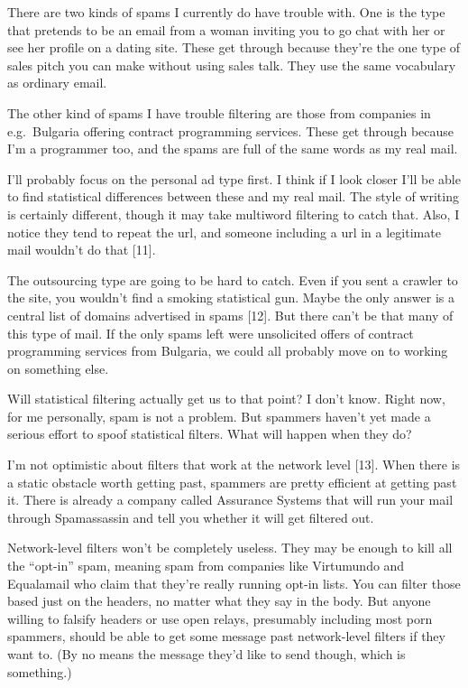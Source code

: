 There are two kinds of spams I currently do have trouble with. One is
the type that pretends to be an email from a woman inviting you to go
chat with her or see her profile on a dating site. These get through
because they're the one type of sales pitch you can make without using
sales talk. They use the same vocabulary as ordinary email.

The other kind of spams I have trouble filtering are those from
companies in e.g.~Bulgaria offering contract programming services. These
get through because I'm a programmer too, and the spams are full of the
same words as my real mail.

I'll probably focus on the personal ad type first. I think if I look
closer I'll be able to find statistical differences between these and my
real mail. The style of writing is certainly different, though it may
take multiword filtering to catch that. Also, I notice they tend to
repeat the url, and someone including a url in a legitimate mail
wouldn't do that {[}11{]}.

The outsourcing type are going to be hard to catch. Even if you sent a
crawler to the site, you wouldn't find a smoking statistical gun. Maybe
the only answer is a central list of domains advertised in spams
{[}12{]}. But there can't be that many of this type of mail. If the only
spams left were unsolicited offers of contract programming services from
Bulgaria, we could all probably move on to working on something else.

Will statistical filtering actually get us to that point? I don't know.
Right now, for me personally, spam is not a problem. But spammers
haven't yet made a serious effort to spoof statistical filters. What
will happen when they do?

I'm not optimistic about filters that work at the network level
{[}13{]}. When there is a static obstacle worth getting past, spammers
are pretty efficient at getting past it. There is already a company
called Assurance Systems that will run your mail through Spamassassin
and tell you whether it will get filtered out.

Network-level filters won't be completely useless. They may be enough to
kill all the ``opt-in'' spam, meaning spam from companies like
Virtumundo and Equalamail who claim that they're really running opt-in
lists. You can filter those based just on the headers, no matter what
they say in the body. But anyone willing to falsify headers or use open
relays, presumably including most porn spammers, should be able to get
some message past network-level filters if they want to. (By no means
the message they'd like to send though, which is something.)

